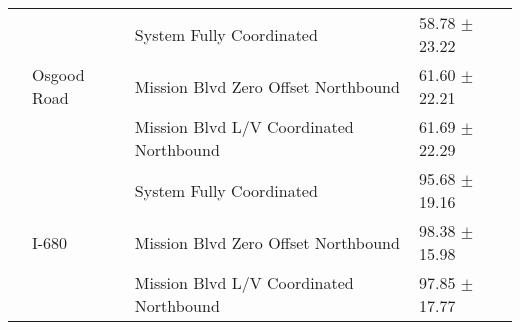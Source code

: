 \begin{tabular}{llll}
 & \multirow[t]{3}{*}{Osgood Road} & System Fully Coordinated & 58.78 $\pm$ 23.22 \\
 &  & Mission Blvd Zero Offset Northbound & 61.60 $\pm$ 22.21 \\
 &  & Mission Blvd L/V Coordinated Northbound & 61.69 $\pm$ 22.29 \\
 & \multirow[t]{3}{*}{I-680} & System Fully Coordinated & 95.68 $\pm$ 19.16 \\
 &  & Mission Blvd Zero Offset Northbound & 98.38 $\pm$ 15.98 \\
 &  & Mission Blvd L/V Coordinated Northbound & 97.85 $\pm$ 17.77 \\
\bottomrule
\end{tabular}
